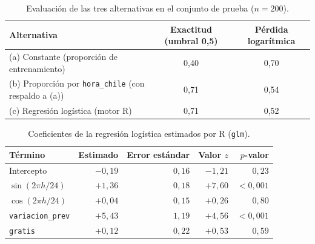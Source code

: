 \documentclass[11pt,a4paper]{article}
\begin{document}
\begin{table}[H]
\centering
\caption{Evaluación de las tres alternativas en el conjunto de prueba ($n = 200$).}
\label{tab:metricas}
\small
\begin{tabular}{@{}lcc@{}}
\toprule
\textbf{Alternativa} & \textbf{Exactitud (umbral 0{,}5)} & \textbf{Pérdida logarítmica} \\
\midrule
(a) Constante (proporción de entrenamiento) & 0{,}40 & 0{,}70 \\
(b) Proporción por \texttt{hora\_chile} (con respaldo a (a)) & 0{,}71 & 0{,}54 \\
(c) Regresión logística (motor R) & 0{,}71 & 0{,}52 \\
\bottomrule
\end{tabular}
\end{table}

\begin{table}[H]
\centering
\caption{Coeficientes de la regresión logística estimados por R (\texttt{glm}).}
\label{tab:coefs}
\small
\begin{tabular}{@{}lrrrr@{}}
\toprule
\textbf{Término} & \textbf{Estimado} & \textbf{Error estándar} & \textbf{Valor $z$} & \textbf{$p$-valor} \\
\midrule
Intercepto              & $-0{,}19$ & $0{,}16$ & $-1{,}21$ & $0{,}23$ \\
$\sin(2\pi h / 24)$     & $+1{,}36$ & $0{,}18$ & $+7{,}60$ & $<0{,}001$ \\
$\cos(2\pi h / 24)$     & $+0{,}04$ & $0{,}15$ & $+0{,}26$ & $0{,}80$ \\
\texttt{variacion\_prev} & $+5{,}43$ & $1{,}19$ & $+4{,}56$ & $<0{,}001$ \\
\texttt{gratis}         & $+0{,}12$ & $0{,}22$ & $+0{,}53$ & $0{,}59$ \\
\bottomrule
\end{tabular}
\end{table}
\end{document}
